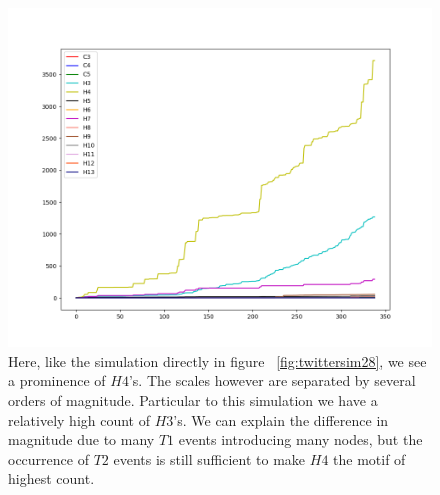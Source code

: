 \begin{figure}[h!]
    \includegraphics[width=16cm]{Images/twitter_sim_for_stats_3_0.8_0.8.png}
    \centering
    \caption{Here, like the simulation directly in figure ~\ref{fig:twittersim28}, we see a prominence of $H4$'s. The scales
    however are separated by several orders of magnitude. Particular to this simulation
     we have a relatively high count of $H3$'s. We can explain the difference in magnitude
     due to many $T1$ events introducing many nodes, but the occurrence of $T2$ events 
     is still sufficient to make $H4$ the motif of highest count.}
     \label{fig:thij0808}
\end{figure}

